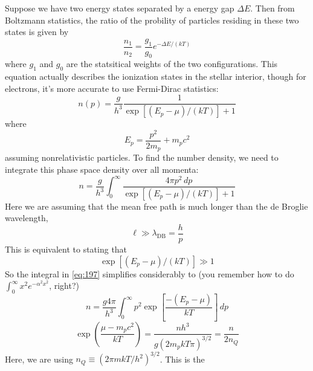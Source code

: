 \documentclass[10pt]{article}
\numberwithin{equation}{section}
\begin{document}
    Suppose we have two energy states separated by a energy gap
    $\Delta E$. Then from Boltzmann statistics, the ratio of the
    probility of particles residing in these two states is given by
    \begin{equation}
      \label{eq:194}
      \frac{n_1}{n_2}=\frac{g_1}{g_0}e^{-\Delta E/(kT)}
    \end{equation}
    where $g_1$ and $g_0$ are the statsitical weights of the two
    configurations. This equation actually describes the ionization
    states in the stellar interior, though for electrons, it's more
    accurate to use Fermi-Dirac statistics:
    \begin{equation}
      \label{eq:195}
      \boxed{n(p)=\frac{g}{h^3}\frac{1}{\exp\left[(E_p-\mu)/(kT)\right]+1}}
    \end{equation}
    where
    \begin{equation}
      \label{eq:196}
      \boxed{E_p=\frac{p^2}{2m_p}+m_pc^2}
    \end{equation}
    assuming nonrelativistic particles. To find the number density, we
    need to integrate this phase space density over all momenta:
    \begin{equation}
      \label{eq:197}
      n=\frac{g}{h^3}\int_0^\infty\frac{4\pi p^2\,dp}{\exp\left[(E_p-\mu)/
(kT)\right]+1}
    \end{equation}
    Here we are assuming that the mean free path is much longer than
    the de Broglie wavelength,
    \begin{equation}
      \label{eq:198}
      \ell\gg \lambda_{\mathrm{DB}}=\frac{h}{p}
    \end{equation}
    This is equivalent to stating that
    \begin{equation}
      \label{eq:199}
      \exp\left[(E_p-\mu)/(kT)\right]\gg 1
    \end{equation}
    So the integral in \eqref{eq:197} simplifies considerably to (you
    remember how to do $\int_0^\infty x^2 e^{-\alpha^2x^2}$, right?)
    \begin{equation}
      \label{eq:200}
      n=\frac{g 4\pi}{h^3}\int_0^\infty p^2 \exp\left[\frac{-(E_p-\mu)}{kT}\right]
\,dp
    \end{equation}
    \begin{equation}
      \label{eq:201}
      \exp\left(\frac{\mu-m_pc^2}{kT}\right)=\frac{nh^3}{g(2m_pk T\pi)^
{3/2}}=\frac{n}{2n_Q}
    \end{equation}
    Here, we are using $n_Q\equiv (2\pi mkT/h^2)^{3/2}$. This is the
\end{document}
